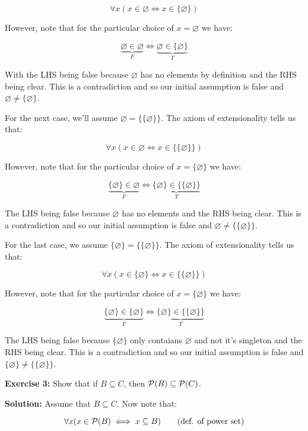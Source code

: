 \documentclass{article}
\begin{document}
$$\forall x(x\in\varnothing\iff x\in\{\varnothing\})$$

However, note that for the particular choice of $x=\varnothing$ we have: 

$$\underbrace{\varnothing\in\varnothing}_{F}\iff \underbrace{\varnothing\in\{\varnothing\}}_{T}$$

With the LHS being false because $\varnothing$ has no elements by definition and the RHS being clear. This is a contradiction and so our initial assumption is false and $\varnothing\not=\{\varnothing\}$.
\bigskip

For the next case, we'll assume $\varnothing=\{\{\varnothing\}\}$. The axiom of extensionality tells us that:

$$\forall x(x\in\varnothing\iff x\in\{\{\varnothing\}\})$$

However, note that for the particular choice of $x=\{\varnothing\}$ we have: 

$$\underbrace{\{\varnothing\}\in\varnothing}_{F}\iff \underbrace{\{\varnothing\}\in\{\{\varnothing\}\}}_{T}$$

The LHS being false because $\varnothing$ has no elements and the RHS being clear. This is a contradiction and so our initial assumption is false and $\varnothing\not=\{\{\varnothing\}\}$.
\bigskip

For the last case, we assume $\{\varnothing\}=\{\{\varnothing\}\}$. The axiom of extensionality tells us that:

$$\forall x(x\in\{\varnothing\}\iff x\in\{\{\varnothing\}\})$$

However, note that for the particular choice of $x=\{\varnothing\}$ we have: 

$$\underbrace{\{\varnothing\}\in\{\varnothing\}}_{F}\iff \underbrace{\{\varnothing\}\in\{\{\varnothing\}\}}_{T}$$

The LHS being false because $\{\varnothing\}$ only contaians $\varnothing$ and not it's singleton and the RHS being clear. This is a contradiction and so our initial assumption is false and $\{\varnothing\}\not=\{\{\varnothing\}\}$.
\bigskip

\noindent\textbf{Exercise 3:} Show that if $B\subseteq C$, then $\mathcal P(B)\subseteq\mathcal P(C)$.
\bigskip

\noindent\textbf{Solution:} Assume that $B\subseteq C$. Now note that:

\begin{equation}
    \forall x(x\in\mathcal P(B)\iff x\subseteq B)\tag{def. of power set}
\end{equation}
\end{document}
